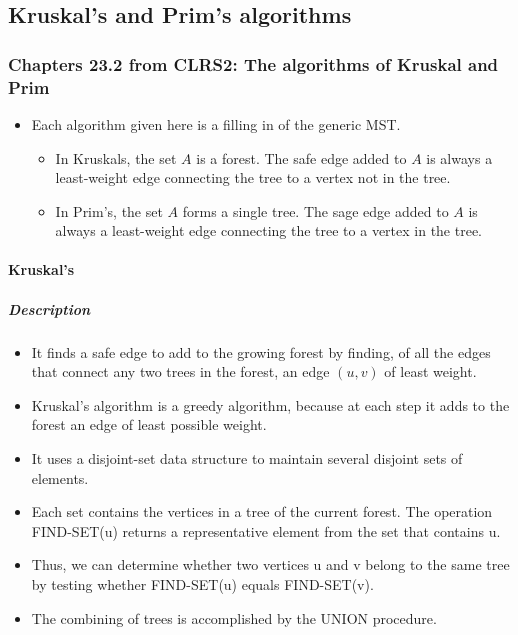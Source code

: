\documentclass[a4paper,11pt]{article}
\begin{document}
\subsection{Kruskal's and Prim's
algorithms}\label{kruskals-and-prims-algorithms}

\subsubsection{Chapters 23.2 from CLRS2: The algorithms of Kruskal and
Prim}\label{chapters-23.2-from-clrs2-the-algorithms-of-kruskal-and-prim}

\begin{itemize}
\itemsep1pt\parskip0pt
\item
  Each algorithm given here is a filling in of the generic MST.

  \begin{itemize}
  \itemsep1pt\parskip0pt
  \item
    In Kruskals, the set $A$ is a forest. The safe edge added to $A$ is
    always a least-weight edge connecting the tree to a vertex not in
    the tree.
  \item
    In Prim's, the set $A$ forms a single tree. The sage edge added to
    $A$ is always a least-weight edge connecting the tree to a vertex in
    the tree.
  \end{itemize}
\end{itemize}

\paragraph{Kruskal's}\label{kruskals}

\subparagraph{Description}\label{description}

\begin{itemize}
\itemsep1pt\parskip0pt
\item
  It finds a safe edge to add to the growing forest by finding, of all
  the edges that connect any two trees in the forest, an edge $(u,v)$ of
  least weight.
\item
  Kruskal's algorithm is a greedy algorithm, because at each step it
  adds to the forest an edge of least possible weight.
\item
  It uses a disjoint-set data structure to maintain several disjoint
  sets of elements.
\item
  Each set contains the vertices in a tree of the current forest. The
  operation FIND-SET(u) returns a representative element from the set
  that contains u.
\item
  Thus, we can determine whether two vertices u and v belong to the same
  tree by testing whether FIND-SET(u) equals FIND-SET(v).
\item
  The combining of trees is accomplished by the UNION procedure.
\end{itemize}
\end{document}
